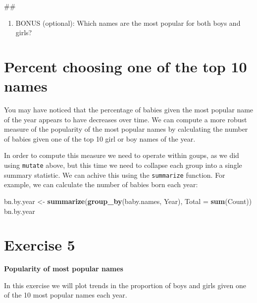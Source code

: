 \documentclass[]{book}
\newenvironment{Shaded}{\begin{snugshade}}{\end{snugshade}}
\newcommand{\KeywordTok}[1]{\textcolor[rgb]{0.13,0.29,0.53}{\textbf{#1}}}
\newcommand{\DataTypeTok}[1]{\textcolor[rgb]{0.13,0.29,0.53}{#1}}
\newcommand{\StringTok}[1]{\textcolor[rgb]{0.31,0.60,0.02}{#1}}
\newcommand{\NormalTok}[1]{#1}
\providecommand{\tightlist}{%
  \setlength{\itemsep}{0pt}\setlength{\parskip}{0pt}}
\begin{document}
\begin{Shaded}
\begin{Highlighting}[]
\NormalTok{##}
\end{Highlighting}
\end{Shaded}

\begin{enumerate}
\def\labelenumi{\arabic{enumi}.}
\setcounter{enumi}{4}
\tightlist
\item
  BONUS (optional): Which names are the most popular for both boys and
  girls?
\end{enumerate}

\section{Percent choosing one of the top 10
names}\label{percent-choosing-one-of-the-top-10-names}

You may have noticed that the percentage of babies given the most
popular name of the year appears to have decreases over time. We can
compute a more robust measure of the popularity of the most popular
names by calculating the number of babies given one of the top 10 girl
or boy names of the year.

In order to compute this measure we need to operate within goups, as we
did using \texttt{mutate} above, but this time we need to collapse each
group into a single summary statistic. We can achive this using the
\texttt{summarize} function. For example, we can calculate the number of
babies born each year:

\begin{Shaded}
\begin{Highlighting}[]
\NormalTok{bn.by.year <-}\StringTok{ }\KeywordTok{summarize}\NormalTok{(}\KeywordTok{group_by}\NormalTok{(baby.names, Year),}
                       \DataTypeTok{Total =} \KeywordTok{sum}\NormalTok{(Count))}
\NormalTok{bn.by.year}
\end{Highlighting}
\end{Shaded}

\section{Exercise 5}\label{exercise-5}

\textbf{Popularity of most popular names}

In this exercise we will plot trends in the proportion of boys and girls
given one of the 10 most popular names each year.
\end{document}
